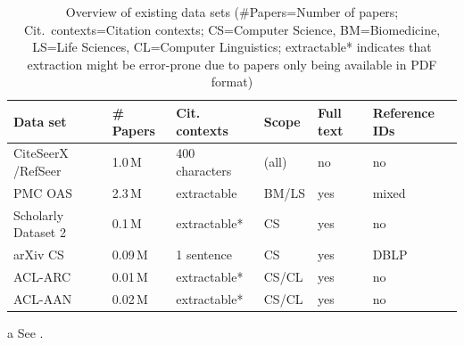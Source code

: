 \begin{table}[tb]
 \caption[Overview of existing data sets]{Overview of existing data sets (\#Papers=Number of papers; Cit.\ contexts=Citation contexts; CS=Computer Science, BM=Biomedicine, LS=Life Sciences, CL=Computer Linguistics; extractable* indicates that extraction might be error-prone due to papers only being available in PDF format)}
 \label{tab:existing-data-sets}
  \centering
  \begin{small}
 \begin{threeparttable}
 \begin{tabular}{llllll}
 \toprule
   Data set & \#\,Papers & Cit. contexts & Scope & Full text & Reference IDs \\
   \midrule
   CiteSeerX \cite{Caragea2014}/RefSeer \cite{Huang2015fixed} &  1.0\,M & 400 characters & (all) & no & no \\
   PMC OAS\tnote{a} & 2.3\,M & extractable & BM/LS & yes & mixed \\
   Scholarly Dataset 2 \cite{Sugiyama2015} & 0.1\,M & extractable* & CS & yes & no \\
   arXiv CS \cite{Faerber2018LREC}   &  0.09\,M & 1 sentence & CS & yes & DBLP \\
   ACL-ARC \cite{Bird2008ACLARC} & 0.01\,M & extractable* & CS/CL & yes & no \\
   ACL-AAN \cite{Radev2013} & 0.02\,M & extractable* & CS/CL & yes & no  \\
   \bottomrule
 \end{tabular}
 \begin{tablenotes}
    \item[a] See .
  \end{tablenotes}
\end{threeparttable}
  \end{small}
\end{table}

